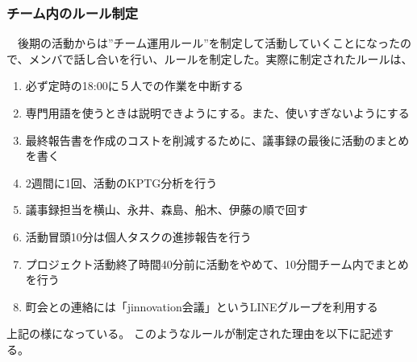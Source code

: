 \subsubsection{チーム内のルール制定}
　後期の活動からは”チーム運用ルール”を制定して活動していくことになったので、メンバで話し合いを行い、ルールを制定した。実際に制定されたルールは、
\begin{enumerate}
    \item 必ず定時の18:00に５人での作業を中断する
    \item 専門用語を使うときは説明できようにする。また、使いすぎないようにする
    \item 最終報告書を作成のコストを削減するために、議事録の最後に活動のまとめを書く
    \item 2週間に1回、活動のKPTG分析を行う
    \item 議事録担当を横山、永井、森島、船木、伊藤の順で回す
    \item 活動冒頭10分は個人タスクの進捗報告を行う
    \item プロジェクト活動終了時間40分前に活動をやめて、10分間チーム内でまとめを行う
    \item 町会との連絡には「jinnovation会議」というLINEグループを利用する
\end{enumerate}
上記の様になっている。
このようなルールが制定された理由を以下に記述する。
